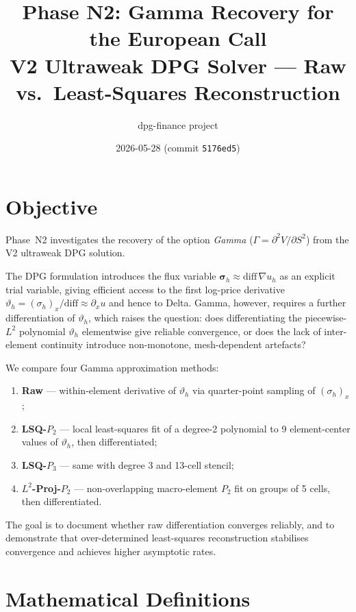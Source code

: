 \documentclass[11pt,a4paper]{article}
\title{\textbf{Phase N2: Gamma Recovery for the European Call}\\
       \large V2 Ultraweak DPG Solver --- Raw vs.\ Least-Squares Reconstruction}
\author{dpg-finance project}
\date{2026-05-28 \quad (commit \texttt{5176ed5})}
\newcommand{\vth}{\vartheta}
\begin{document}
\maketitle
\tableofcontents
\bigskip

\section{Objective}

Phase~N2 investigates the recovery of the option \emph{Gamma}
($\Gamma = \partial^2 V/\partial S^2$) from the V2 ultraweak DPG solution.

The DPG formulation introduces the flux variable
$\boldsymbol{\sigma}_h \approx \mathrm{diff}\,\nabla u_h$
as an explicit trial variable, giving efficient access to the first
log-price derivative $\vth_h = (\sigma_h)_x / \mathrm{diff} \approx \partial_x u$
and hence to Delta.  Gamma, however, requires a further differentiation of
$\vth_h$, which raises the question: does differentiating the
piecewise-$L^2$ polynomial $\vth_h$ elementwise give reliable convergence,
or does the lack of inter-element continuity introduce non-monotone,
mesh-dependent artefacts?

We compare four Gamma approximation methods:
\begin{enumerate}[noitemsep]
  \item \textbf{Raw} --- within-element derivative of $\vth_h$ via quarter-point
        sampling of $(\sigma_h)_x$;
  \item \textbf{LSQ-$P_2$} --- local least-squares fit of a degree-2 polynomial
        to 9 element-center values of $\vth_h$, then differentiated;
  \item \textbf{LSQ-$P_3$} --- same with degree 3 and 13-cell stencil;
  \item \textbf{$L^2$-Proj-$P_2$} --- non-overlapping macro-element $P_2$ fit
        on groups of 5 cells, then differentiated.
\end{enumerate}
The goal is to document whether raw differentiation converges reliably, and
to demonstrate that over-determined least-squares reconstruction stabilises
convergence and achieves higher asymptotic rates.

\section{Mathematical Definitions}
\end{document}
